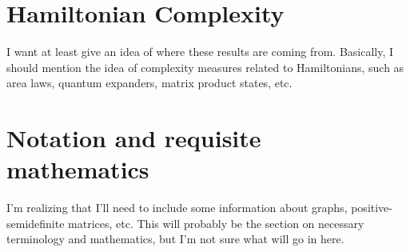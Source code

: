 \documentclass[../thesis-main/thesis-main]{subfiles}
\begin{document}

\section{Hamiltonian Complexity}

I want at least give an idea of where these results are coming from.  Basically, I should mention the idea of complexity measures related to Hamiltonians, such as area laws, quantum expanders, matrix product states, etc.


\section{Notation and requisite mathematics}

I'm realizing that I'll need to include some information about graphs, positive-semidefinite matrices, etc.  This will probably be the section on necessary terminology and mathematics, but I'm not sure what will go in here.
\end{document}
